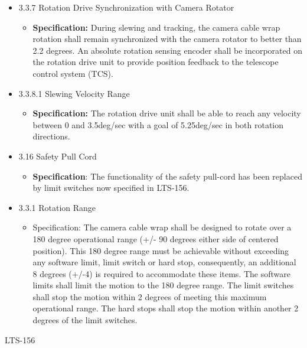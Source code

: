 \documentclass[SE,lsstdraft,authoryear,toc]{lsstdoc}
\begin{document}
\begin{itemize}
\item
  3.3.7 Rotation Drive Synchronization with Camera Rotator

  \begin{itemize}
  \item
    \textbf{Specification:} During slewing and tracking, the camera
    cable wrap rotation shall remain synchronized with the camera
    rotator to better than 2.2 degrees. An absolute rotation sensing
    encoder shall be incorporated on the rotation drive unit to provide
    position feedback to the telescope control system (TCS).
  \end{itemize}
\item
  3.3.8.1 Slewing Velocity Range

  \begin{itemize}
  \item
    \textbf{Specification:} The rotation drive unit shall be able to
    reach any velocity between 0 and 3.5deg/sec with a goal of
    5.25deg/sec in both rotation directions.
  \end{itemize}
\item
  3.16 Safety Pull Cord

  \begin{itemize}
  \item
    \textbf{Specification}: The functionality of the safety pull-cord
    has been replaced by limit switches now specified in LTS-156.
  \end{itemize}
\item
  3.3.1 Rotation Range

  \begin{itemize}
  \item
    Specification: The camera cable wrap shall be designed to rotate
    over a 180 degree operational range (+/- 90 degrees either side of
    centered position). This 180 degree range must be achievable without
    exceeding any software limit, limit switch or hard stop,
    consequently, an additional 8 degrees (+/-4) is required to
    accommodate these items. The software limits shall limit the motion
    to the 180 degree range. The limit switches shall stop the motion
    within 2 degrees of meeting this maximum operational range. The hard
    stops shall stop the motion within another 2 degrees of the limit
    switches.
  \end{itemize}
\end{itemize}

LTS-156
\end{document}
